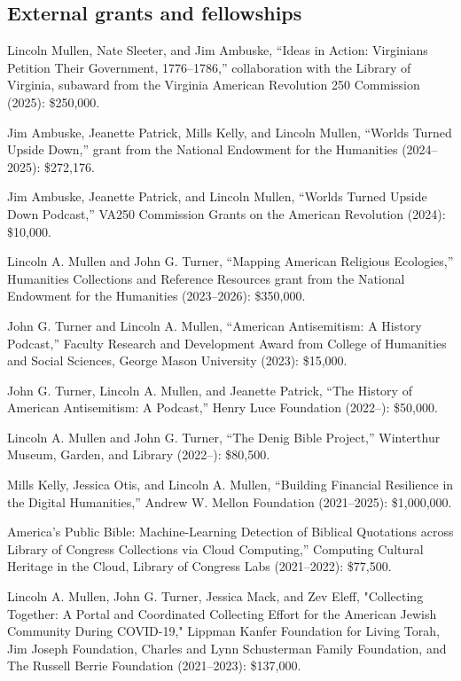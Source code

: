 \documentclass[11pt]{article}
\begin{document}
\subsection{External grants and fellowships}\label{Grants and fellowships}


Lincoln Mullen, Nate Sleeter, and Jim Ambuske, ``Ideas in Action: Virginians Petition Their Government, 1776–1786,'' collaboration with the Library of Virginia, subaward from the Virginia American Revolution 250 Commission (2025): \$250,000.

Jim Ambuske, Jeanette Patrick, Mills Kelly, and Lincoln Mullen, ``Worlds Turned Upside Down,'' grant from the National Endowment for the Humanities (2024--2025): \$272,176.

Jim Ambuske, Jeanette Patrick, and Lincoln Mullen, ``Worlds Turned Upside Down Podcast,'' VA250 Commission Grants on the American Revolution (2024): \$10,000.

Lincoln A. Mullen and John G. Turner, ``Mapping American Religious Ecologies,'' Humanities Collections and Reference Resources grant from the National Endowment for the Humanities (2023--2026): \$350,000.

John G. Turner and Lincoln A. Mullen, ``American Antisemitism: A History Podcast,'' Faculty Research and Development Award from College of Humanities and Social Sciences, George Mason University (2023): \$15,000.

John G. Turner, Lincoln A. Mullen, and Jeanette Patrick, ``The History of American Antisemitism: A Podcast,'' Henry Luce Foundation (2022--): \$50,000.

Lincoln A. Mullen and John G. Turner, ``The Denig Bible Project,'' Winterthur Museum, Garden, and Library (2022--): \$80,500.

Mills Kelly, Jessica Otis, and Lincoln A. Mullen, ``Building Financial Resilience in the Digital Humanities,'' Andrew W. Mellon Foundation (2021--2025): \$1,000,000.

\noindent{}America's Public Bible: Machine-Learning Detection of Biblical Quotations across Library of Congress Collections via Cloud Computing,'' Computing Cultural Heritage in the Cloud, Library of Congress Labs (2021--2022): \$77,500.

Lincoln A. Mullen, John G. Turner, Jessica Mack, and Zev Eleff, "Collecting Together: A Portal and Coordinated Collecting Effort for the American Jewish Community During COVID-19," Lippman Kanfer Foundation for Living Torah, Jim Joseph Foundation, Charles and Lynn Schusterman Family Foundation, and The Russell Berrie Foundation (2021--2023): \$137,000.
\end{document}
